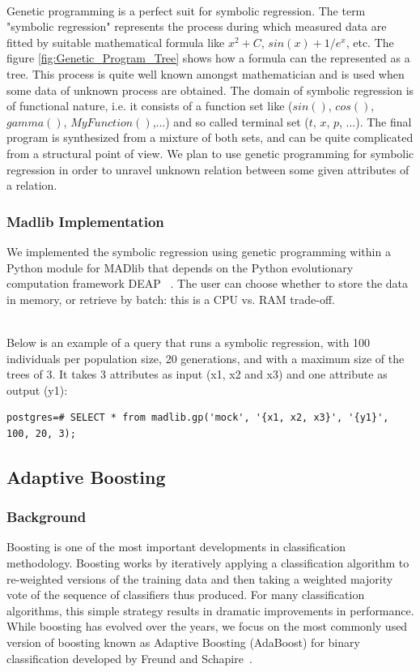 ~~\\
Genetic programming is a perfect suit for symbolic regression. The term "symbolic regression" represents the process during which measured data are fitted by suitable mathematical formula like $x^2 + C$, $sin(x) + 1/e^x$,  etc. The figure \ref{fig:Genetic_Program_Tree} shows how a formula can the represented as a tree. This process is quite well known amongst mathematician and is used when some data of unknown process are obtained. The domain of symbolic regression is of functional nature, i.e. it consists of a function set like ($sin()$, $cos()$, $gamma()$, $MyFunction()$,...) and so called terminal set ($t$, $x$, $p$, ...). The final program is synthesized from a mixture of both sets, and can be quite complicated from a structural point of view. We plan to use genetic programming for symbolic regression in order to unravel unknown relation between some given attributes of a relation. 


\subsubsection{Madlib Implementation}
We implemented the symbolic regression using genetic programming within a Python module for MADlib that depends on the Python evolutionary computation framework DEAP ~\cite{DEAPJMLR2012}. The user can choose whether to store the data in memory, or retrieve by batch: this is a CPU vs. RAM trade-off.

~~\\
Below is an example of a query that runs a symbolic regression, with 100 individuals per population size, 20 generations, and with a maximum size of the trees of 3. It takes 3 attributes as input (x1, x2 and x3) and one attribute as output (y1):

\begin{verbatim}
postgres=# SELECT * from madlib.gp('mock', '{x1, x2, x3}', '{y1}', 100, 20, 3);
\end{verbatim}

\subsection{Adaptive Boosting}
\subsubsection{Background}
Boosting is one of the most important developments in classification methodology. Boosting works by iteratively applying a classification algorithm to re-weighted versions of the training data and then taking a weighted majority vote of the sequence of classifiers thus produced. For many classification algorithms, this simple strategy results in dramatic improvements in performance. While boosting has evolved over the years, we focus on the most commonly used version of boosting known as Adaptive Boosting (AdaBoost) for binary classification developed by Freund and Schapire~\cite{boost96}.

